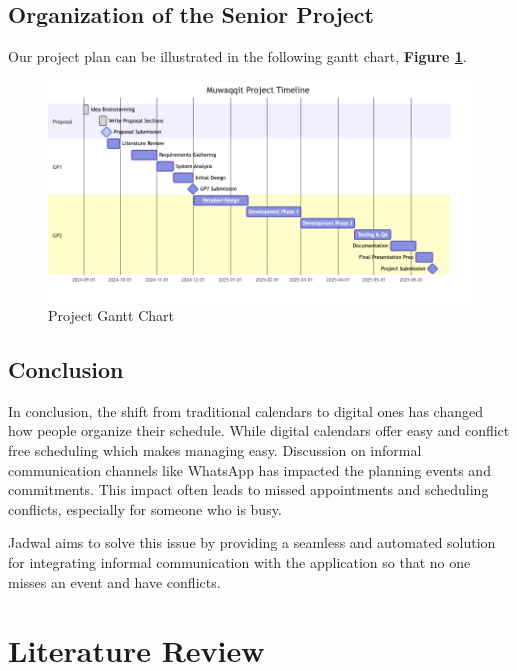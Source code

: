 \documentclass[12pt,a4paper]{report}
\begin{document}
\newpage

\section{Organization of the Senior Project}

Our project plan can be illustrated in the following gantt chart, \textbf{Figure \ref{fig:project-gantt-chart}}.

\begin{figure}[!h]
    \centering
    \includegraphics[width=\textwidth]{images/gantt.png}
    \caption{Project Gantt Chart}
    \label{fig:project-gantt-chart}
\end{figure}

\section{Conclusion}

In conclusion, the shift from traditional calendars to digital ones has changed how people organize their schedule. While digital calendars offer easy and conflict free scheduling which makes managing easy. Discussion on informal communication channels like WhatsApp has impacted the planning events and commitments. This impact often leads to missed appointments and scheduling conflicts, especially for someone who is busy.

Jadwal aims to solve this issue by providing a seamless and automated solution for integrating informal communication with the application so that no one misses an event and have conflicts. 

\chapter{Literature Review}
\end{document}

